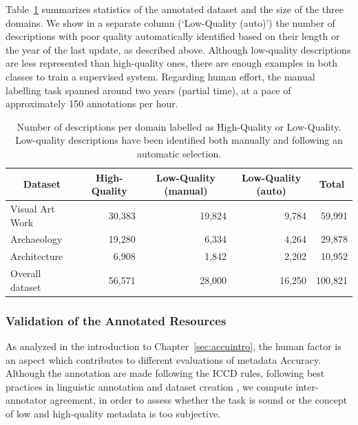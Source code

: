 \documentclass[epsfig,a4paper,12pt,titlepage]{book}
\begin{document}
 Table~\ref{tab:1} summarizes statistics of the annotated data\-set and the size of the three domains. We show in a separate column (`Low-Quality (auto)') the number of descriptions with poor quality automatically identified based on their length or the year of the last update, as described above. Although low-quality descriptions are less represented than high-quali\-ty ones, there are enough examples in both classes to train a supervised system. Regarding human effort, the manual labelling task spanned around two years (partial time), at a pace of approximately 150 annotations per hour.


\begin{table}[t]

\caption{Number of descriptions per domain labelled as High-Quality or Low-Quality. Low-quality descriptions have been identified both manually and following an automatic selection.}
\label{tab:1}       %
\centering
\begin{tabular}{|l|r|r|r|r|} 
\hline
\multicolumn{1}{|c|}{Dataset} & \multicolumn{1}{|c|}{High-Quality} & \multicolumn{1}{|c|}{Low-Quality (manual)} & \multicolumn{1}{|c|}{Low-Quality (auto)} & \multicolumn{1}{|c|}{Total} \\ 
\hline
Visual Art Work             & 30,383    & 19,824    & 9,784 & 59,991         \\ \hline
Archaeology                 & 19,280    & 6,334     & 4,264 & 29,878         \\ \hline
Architecture                & 6,908     & 1,842     & 2,202 & 10,952           \\ \hline
\hline
Overall dataset             & 56,571    & 28,000    & 16,250 & 100,821          \\\hline
\hline
\end{tabular}

\end{table}
\subsubsection{Validation of the Annotated Resources}
 
As analyzed in the introduction to Chapter~\ref{sec:accuintro}, the human factor is an aspect which contributes to different evaluations of metadata Accuracy. Although the annotation are made following the ICCD rules, following best practices in linguistic annotation and dataset creation \cite{DBLP:books/daglib/0031957}, we compute inter-annotator agreement, in order to assess whether the task is sound or the concept of low and high-quality metadata is too subjective.
\end{document}
